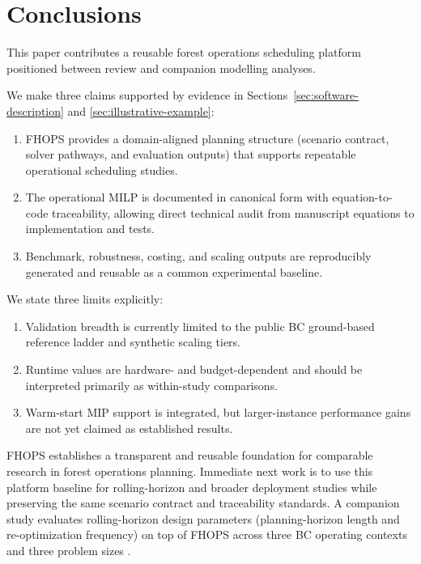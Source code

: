 \section{Conclusions}
\label{sec:conclusions}

This paper contributes a reusable forest operations scheduling platform positioned between review and companion modelling analyses.

We make three claims supported by evidence in Sections~\ref{sec:software-description} and \ref{sec:illustrative-example}:
\begin{enumerate}
  \item FHOPS provides a domain-aligned planning structure (scenario contract, solver pathways, and evaluation outputs) that supports repeatable operational scheduling studies.
  \item The operational MILP is documented in canonical form with equation-to-code traceability, allowing direct technical audit from manuscript equations to implementation and tests.
  \item Benchmark, robustness, costing, and scaling outputs are reproducibly generated and reusable as a common experimental baseline.
\end{enumerate}

We state three limits explicitly:
\begin{enumerate}
  \item Validation breadth is currently limited to the public BC ground-based reference ladder and synthetic scaling tiers.
  \item Runtime values are hardware- and budget-dependent and should be interpreted primarily as within-study comparisons.
  \item Warm-start MIP support is integrated, but larger-instance performance gains are not yet claimed as established results.
\end{enumerate}

FHOPS establishes a transparent and reusable foundation for comparable research in forest operations planning. Immediate next work is to use this platform baseline for rolling-horizon and broader deployment studies while preserving the same scenario contract and traceability standards. A companion study evaluates rolling-horizon design parameters (planning-horizon length and re-optimization frequency) on top of FHOPS across three BC operating contexts and three problem sizes \cite{jaffray2026thesis}.
